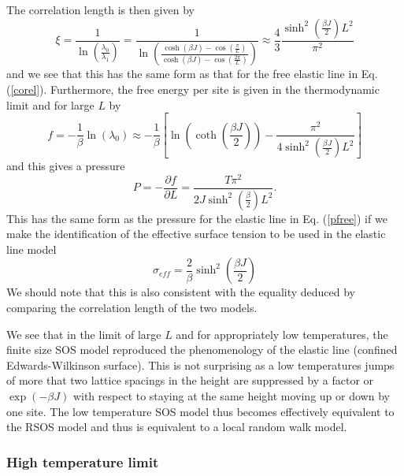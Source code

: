 The correlation length is then given by
\begin{equation}
\xi =\frac{1}{\ln(\frac{\lambda_0}{\lambda_1})} = \frac{1}{\ln(\frac{\cosh(\beta J) - \cos(\frac{\pi}{L})}{\cosh(\beta J) - \cos(\frac{2\pi}{L})})}\approx \frac{4}{3}\frac{\sinh^2(\frac{\beta J}{2})L^2}{\pi^2}
\end{equation}
and we see that this has the same form as that for the free elastic line in Eq. (\ref{corel}).
Furthermore, the free energy per site is given in the thermodynamic limit and for large $L$ by
\begin{equation}
f=-\frac{1}{\beta}\ln(\lambda_0) \approx -\frac{1}{\beta}\left[ \ln(\coth(\frac{\beta J}{2}))- \frac{\pi^2}{4\sinh^2(\frac{\beta J}{2}) L^2}\right]
\end{equation}
and this gives a pressure
\begin{equation}
P= -\frac{\partial f}{\partial L}= \frac{T\pi^2}{2 J\sinh^2(\frac{\beta}{2}) L^2}.
\end{equation}
This has the same form as the pressure for the elastic line in Eq. (\ref{pfree}) if we make the identification of the effective surface tension to be used in the elastic line model
\begin{equation}
\sigma_{eff} = \frac{2}{\beta}\sinh^2(\frac{\beta J}{2})
\end{equation}
We should note that this is also consistent with the equality deduced by comparing the correlation length of the two models.

We see that in the limit of large $L$ and for appropriately low temperatures, the finite size SOS model reproduced the phenomenology of the elastic line (confined Edwards-Wilkinson surface). 
This is not surprising as a low temperatures jumps of more that two lattice spacings in the height are suppressed by a factor or $\exp(-\beta J)$ with respect to staying at the same height moving up or down by one site. The low temperature SOS model thus becomes effectively equivalent to the RSOS model and thus is equivalent to a local random walk model. 

\subsubsection*{High temperature limit}

